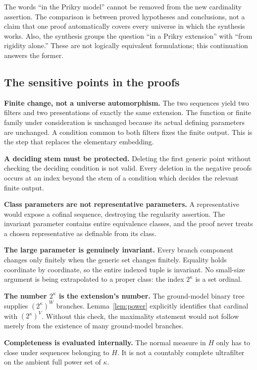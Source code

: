 \documentclass[11pt,letterpaper]{article}
\theoremstyle{definition}
\numberwithin{equation}{section}
\begin{document}
The words ``in the Prikry model'' cannot be removed from the new cardinality assertion. The comparison is between proved hypotheses and conclusions, not a claim that one proof automatically covers every universe in which the synthesis works. Also, the synthesis groups the question ``in a Prikry extension'' with ``from rigidity alone.'' These are not logically equivalent formulations; this continuation answers the former.

\subsection{The sensitive points in the proofs}

\textbf{Finite change, not a universe automorphism.}
The two sequences yield two filters and two presentations of exactly the same extension. The function or finite family under consideration is unchanged because its actual defining parameters are unchanged. A condition common to both filters fixes the finite output. This is the step that replaces the elementary embedding.

\textbf{A deciding stem must be protected.}
Deleting the first generic point without checking the deciding condition is not valid. Every deletion in the negative proofs occurs at an index beyond the stem of a condition which decides the relevant finite output.

\textbf{Class parameters are not representative parameters.}
A representative would expose a cofinal sequence, destroying the regularity assertion. The invariant parameter contains entire equivalence classes, and the proof never treats a chosen representative as definable from its class.

\textbf{The large parameter is genuinely invariant.}
Every branch component changes only finitely when the generic set changes finitely. Equality holds coordinate by coordinate, so the entire indexed tuple is invariant. No small-size argument is being extrapolated to a proper class: the index $2^\kappa$ is a set ordinal.

\textbf{The number $2^\kappa$ is the extension's number.}
The ground-model binary tree supplies $(2^\kappa)^W$ branches. Lemma~\ref{lem:power} explicitly identifies that cardinal with $(2^\kappa)^V$. Without this check, the maximality statement would not follow merely from the existence of many ground-model branches.

\textbf{Completeness is evaluated internally.}
The normal measure in $H$ only has to close under sequences belonging to $H$. It is not a countably complete ultrafilter on the ambient full power set of $\kappa$.
\end{document}

